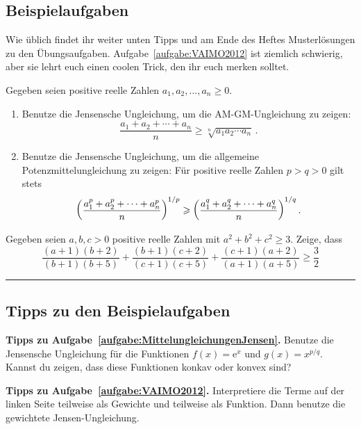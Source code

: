 \subsection*{Beispielaufgaben}
Wie üblich findet ihr weiter unten Tipps und am Ende des Heftes Musterlösungen zu den Übungsaufgaben. Aufgabe~\ref{aufgabe:VAIMO2012} ist ziemlich schwierig, aber sie lehrt euch einen coolen Trick, den ihr euch merken solltet.
\begin{aufgabe*}\label{aufgabe:MittelungleichungenJensen}
	Gegeben seien positive reelle Zahlen $a_1,a_2,\dotsc,a_n\geqslant 0$.
	\begin{enumerate}[label={$(\alph*)$},ref={$(\alph*)$}]
		\item Benutze die Jensensche Ungleichung, um die AM-GM-Ungleichung zu zeigen:\label{aufgabe:AM-GM-MitJensen}
		\begin{equation*}
			\frac{a_1+a_2+\dotsb+a_n}{n}\geqslant \sqrt[n]{a_1a_2\dotsm a_n}\,.
		\end{equation*}
		\item Benutze die Jensensche Ungleichung, um die allgemeine Potenzmittelungleichung zu zeigen: Für positive reelle Zahlen $p>q>0$ gilt stets\label{aufgabe:PotenzmittelMitJensen}
		\begin{equation*}
			\parens*{\frac{a_1^{p}+a_2^{p}+\dotsb+a_n^{p}}{n}}^{1/p}\geqslant \parens*{\frac{a_1^{q}+a_2^{q}+\dotsb+a_n^q}{n}}^{1/q}\,.
		\end{equation*}
	\end{enumerate}
\end{aufgabe*}
\begin{aufgabe*}[**]\label{aufgabe:VAIMO2012}
	Gegeben seien $a,b,c>0$ positive reelle Zahlen mit $a^2+b^2+c^2\geqslant 3$. Zeige, dass
	\begin{equation*}
		\frac{(a+1)(b+2)}{(b+1)(b+5)}+\frac{(b+1)(c+2)}{(c+1)(c+5)}+\frac{(c+1)(a+2)}{(a+1)(a+5)}\geqslant\frac32
	\end{equation*}
\end{aufgabe*}

\vfill\hrule\vspace{-1em}

\subsection*{Tipps zu den Beispielaufgaben}
\textbf{Tipps zu Aufgabe~\ref{aufgabe:MittelungleichungenJensen}.} Benutze die Jensensche Ungleichung für die Funktionen $f(x)=\mathrm{e}^x$ und $g(x)=x^{p/q}$. Kannst du zeigen, dass diese Funktionen konkav oder konvex sind?

\textbf{Tipps zu Aufgabe~\ref{aufgabe:VAIMO2012}.} Interpretiere die Terme auf der linken Seite teilweise als Gewichte und teilweise als Funktion. Dann benutze die gewichtete Jensen-Ungleichung.

